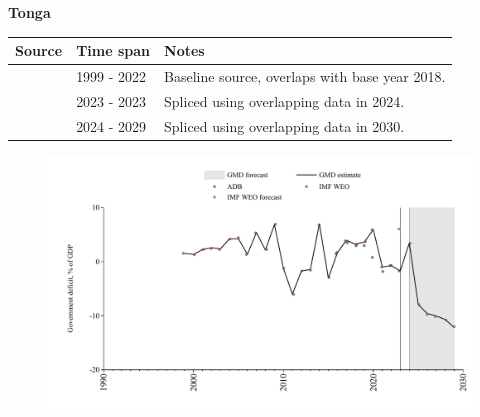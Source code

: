 \documentclass[12pt,a4paper,landscape]{article}
\begin{document}
\begin{adjustbox}{max totalsize={\paperwidth}{\paperheight},center}
\begin{minipage}[t][\textheight][t]{\textwidth}
\vspace*{0.5cm}
{}
\begin{center}
{\Large\bfseries Tonga}
\end{center}
\vspace{0.5cm}
\begin{table}[H]
\centering
\small
\begin{tabular}{|l|l|l|}
\hline
\textbf{Source} & \textbf{Time span} & \textbf{Notes} \\
\hline
\rowcolor{white}\cite{IMF_WEO}& 1999 - 2022 &Baseline source, overlaps with base year 2018.\\
\rowcolor{lightgray}\cite{ADB}& 2023 - 2023 &Spliced using overlapping data in 2024.\\
\rowcolor{white}\cite{IMF_WEO_forecast}& 2024 - 2029 &Spliced using overlapping data in 2030.\\
\hline
\end{tabular}
\end{table}
\begin{figure}[H]
\centering
\includegraphics[width=\textwidth,height=0.6\textheight,keepaspectratio]{graphs/TON_govdef_GDP.pdf}
\end{figure}
\end{minipage}
\end{adjustbox}
\end{document}
